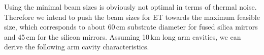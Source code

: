 Using the minimal beam sizes is obviously not optimal in terms of thermal noise.
Therefore we intend to push the beam sizes for ET towards the maximum feasible
size, which corresponds to about 60\,cm substrate diameter for fused silica
mirrors and 45\,cm for the silicon mirrors. Assuming 10\,km long arm cavities,
we can derive the following arm cavity characteristics.

